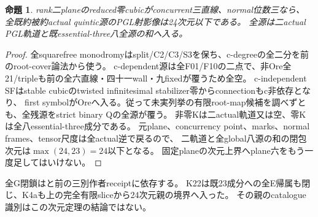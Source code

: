 \documentclass[a4paper,11pt]{ltjsarticle}
\newtheorem{proposition}{命題}[section]
\theoremstyle{definition}
\begin{document}
\begin{proposition}\label{prop:plane-concurrent-m3-whole-G}
rank二planeのreduced零cubicがconcurrent三直線、normal位数三なら、
全既約被約actual quintic源のPGL射影像は24次元以下である。
全源は二actual PGL軌道と既essential-three八全源の和へ入る。
\end{proposition}
\begin{proof}
全squarefree monodromyはsplit/C2/C3/S3を保ち、c-degreeの全二分を前のroot-cover論法から使う。
c-dependent源は全F01/F10の二点で、非Ore全21/tripleも前の全六直線・四十一wall・九fixedが覆うため全空。
c-independent SFはstable cubicのtwisted infinitesimal stabilizer零からconnectionもc非依存となり、
first symbolがOreへ入る。従って未実列挙の有限root-map候補を調べずとも、全残源をstrict binary Qの全源が覆う。
非零Kは二actual軌道又は空、零Kは全八essential-three成分である。
元plane、concurrency point、marks、normal frames、tensor尺度は全actual逆で戻るので、
二軌道と全global八源の和の閉包次元は$\max(24,23)=24$以下となる。
固定planeの次元上界へplane六をもう一度足してはいけない。
\end{proof}
全G閉鎖はと前の三別作者receiptに依存する。
K22は既23成分への全E帰属も閉じ、K4aも上の完全有限sliceから24次元親の境界へ入った。
その親のcatalogue識別はこの次元定理の結論ではない。
\end{document}
